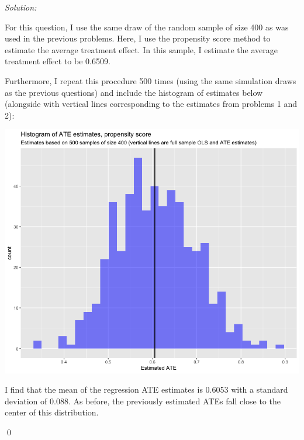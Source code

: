 \documentclass[12pt]{article}
\newenvironment{problem}[2][Problem]{\begin{trivlist}
\item[\hskip \labelsep {\bfseries #1}\hskip \labelsep {\bfseries #2.}]}{\end{trivlist}}
\newenvironment{sol}
    {\emph{Solution:}
    }
    {
    \qed
    }
\begin{document}
\begin{problem}{5}
\end{problem}
\begin{sol}
    For this question, I use the same draw of the random sample of size 400 as was used in the previous problems. Here, I use the propensity score method to estimate the average treatment effect. In this sample, I estimate the average treatment effect to be 0.6509.
    
    Furthermore, I repeat this procedure 500 times (using the same simulation draws as the previous questions) and include the histogram of estimates below (alongside with vertical lines corresponding to the estimates from problems 1 and 2):
    
    \begin{center}
        \includegraphics[scale=0.5]{Prop_hist.png}
    \end{center}
    
    I find that the mean of the regression ATE estimates is 0.6053 with a standard deviation of 0.088. As before, the previously estimated ATEs fall close to the center of this distribution.
    \end{sol}
\end{document}
